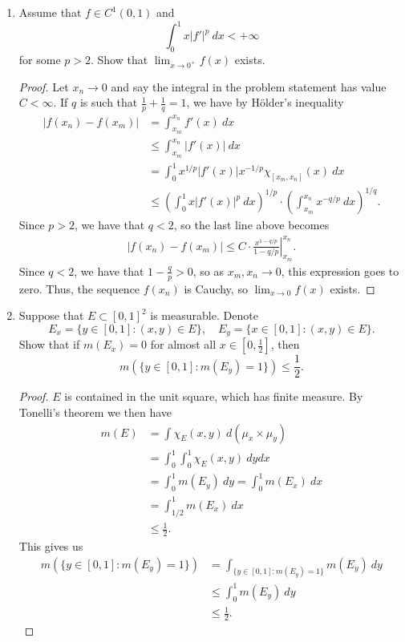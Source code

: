 \documentclass[11pt,letterpaper]{report}
\begin{document}
\begin{enumerate}
	\item Assume that $f\in C^1(0, 1)$ and
	\[
	\int_0^1x|f'|^p\ dx <+\infty
	\]
	for some $p>2$. Show that $\lim_{x\to 0^+}f(x)$ exists.
	\begin{proof}
		Let $x_n\to 0$ and say the integral in the problem statement has value $C<\infty$. If $q$ is such that $\frac{1}{p}+\frac{1}{q} = 1$, we have by H\"older's inequality
		\begin{align*}
			|f(x_n)-f(x_m)| &= \int_{x_m}^{x_n}f'(x)\ dx\\
			&\leq \int_{x_m}^{x_n}|f'(x)|\ dx\\
			&= \int_0^1x^{1/p}|f'(x)|x^{-1/p}\chi_{[x_m, x_n]}(x)\ dx\\
			&\leq \left(\int_0^1x|f'(x)|^p\ dx\right)^{1/p}\cdot \left(\int_{x_m}^{x_n}x^{-q/p}\ dx\right)^{1/q}.
		\end{align*}
		Since $p>2$, we have that $q<2$, so the last line above becomes
		\begin{align*}
			|f(x_n)-f(x_m)| \leq C\cdot \left.\frac{x^{1-q/p}}{1-q/p}\right|_{x_m}^{x_n}.
		\end{align*}
		Since $q<2$, we have that $1-\frac{q}{p}>0$, so as $x_m,x_n\to 0$, this expression goes to zero. Thus, the sequence $f(x_n)$ is Cauchy, so $\lim_{x\to 0}f(x)$ exists.
	\end{proof}

	\item Suppose that $E\subset [0,1]^2$ is measurable. Denote
	\[
	E_x = \{y\in [0,1]: (x,y)\in E\},\quad E_y = \{x\in [0,1]: (x,y)\in E\}.
	\]
	Show that if $m(E_x) = 0$ for almost all $x\in [0, \frac{1}{2}]$, then
	\[
	m(\{y\in [0,1]: m(E_y) = 1\})\leq \frac{1}{2}.
	\]
	\begin{proof}
		$E$ is contained in the unit square, which has finite measure. By Tonelli's theorem we then have
		\begin{align*}
			m(E) &= \int \chi_E(x,y)\ d(\mu_x\times \mu_y)\\
			&= \int_0^1\int_0^1\chi_E(x,y)\ dydx\\
			&= \int_0^1 m(E_y)\ dy =  \int_0^1m(E_x)\ dx\\
			&= \int_{1/2}^1m(E_x)\ dx\\
			&\leq \frac{1}{2}.
		\end{align*}
		This gives us
		\begin{align*}
		m(\{y\in [0,1]: m(E_y) = 1\}) &= \int_{\{y\in [0,1]: m(E_y) = 1\}}m(E_y)\ dy\\
		&\leq \int_0^1 m(E_y)\ dy\\
		&\leq \frac{1}{2}.
		\end{align*}
	\end{proof}


\end{enumerate}
\end{document}
